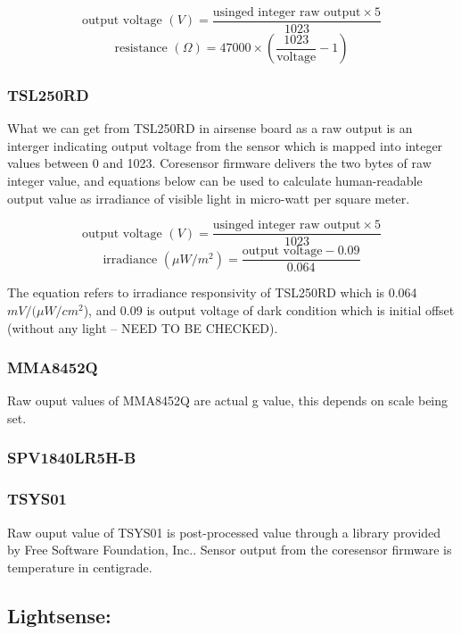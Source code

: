 {\centering
 \[ \text{output voltage } (V) = \frac{\text{usinged integer raw output} \times 5}{1023} \] 
 \[ \text{resistance } (\Omega) = 47000 \times \left(\frac{1023}{\text{voltage}} - 1\right) \]
 \par
 }


\subsubsection{ TSL250RD}

What we can get from TSL250RD in airsense board as a raw output is an interger indicating output voltage from the sensor which is mapped into integer values between 0 and 1023. Coresensor firmware delivers the two bytes of raw integer value, and equations below can be used to calculate human-readable output value as irradiance of visible light in micro-watt per square meter.

{\centering
 \[ \text{output voltage }(V) = \frac{\text{usinged integer raw output} \times 5}{1023} \] 
 \[ \text{irradiance } (\mu W/m^2) = \frac{\text{output voltage} - 0.09}{0.064} \]
 \par
 }
 
\bigbreak
The equation refers to irradiance responsivity of TSL250RD which is 0.064 \(mV/(\mu W/cm^2\)), and 0.09 is output voltage of dark condition which is initial offset (without any light -- NEED TO BE CHECKED).

\subsubsection{ MMA8452Q}

Raw ouput values of MMA8452Q are actual g value, this depends on scale being set.

\subsubsection{ SPV1840LR5H-B}

\subsubsection{ TSYS01}

Raw ouput value of TSYS01 is post-processed value through a library provided by  Free Software Foundation, Inc.. Sensor output from the coresensor firmware is temperature in centigrade.


\subsection{Lightsense:}
